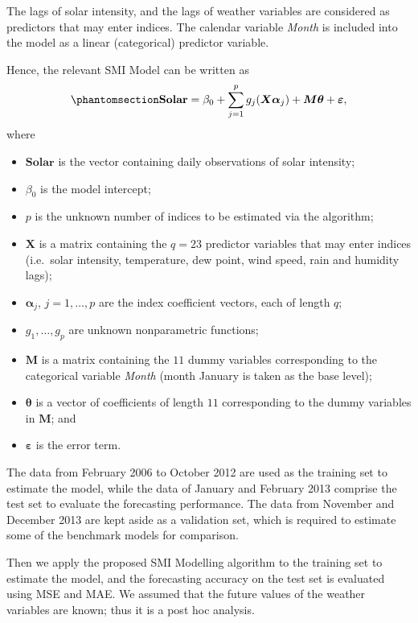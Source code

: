 \documentclass[
  11pt,
  a4paper,
]{article}
\providecommand{\tightlist}{%
  \setlength{\itemsep}{0pt}\setlength{\parskip}{0pt}}\usepackage{longtable,booktabs,array}
\begin{document}
The lags of solar intensity, and the lags of weather variables are
considered as predictors that may enter indices. The calendar variable
\emph{Month} is included into the model as a linear (categorical)
predictor variable.

Hence, the relevant SMI Model can be written as
\begin{equation}\phantomsection\label{eq-solar}{
  \textbf{Solar} = \beta_{0} + \sum_{j = 1}^{p}{g_{j}(\bm{X}\bm{\alpha}_{j})} + \bm{M}\bm{\theta} + \bm{\varepsilon},
}\end{equation} where

\begin{itemize}
\tightlist
\item
  \(\textbf{Solar}\) is the vector containing daily observations of
  solar intensity;
\item
  \(\beta_{0}\) is the model intercept;
\item
  \(p\) is the unknown number of indices to be estimated via the
  algorithm;
\item
  \(\bm{X}\) is a matrix containing the \(q=23\) predictor variables
  that may enter indices (i.e.~solar intensity, temperature, dew point,
  wind speed, rain and humidity lags);
\item
  \(\bm{\alpha}_{j}\), \(j = 1, \dots, p\) are the index coefficient
  vectors, each of length \(q\);
\item
  \(g_{1}, \dots, g_{p}\) are unknown nonparametric functions;
\item
  \(\bm{M}\) is a matrix containing the \(11\) dummy variables
  corresponding to the categorical variable \emph{Month} (month January
  is taken as the base level);
\item
  \(\bm{\theta}\) is a vector of coefficients of length \(11\)
  corresponding to the dummy variables in \(\bm{M}\); and
\item
  \(\bm{\varepsilon}\) is the error term.
\end{itemize}

The data from February 2006 to October 2012 are used as the training set
to estimate the model, while the data of January and February 2013
comprise the test set to evaluate the forecasting performance. The data
from November and December 2013 are kept aside as a validation set,
which is required to estimate some of the benchmark models for
comparison.

Then we apply the proposed SMI Modelling algorithm to the training set
to estimate the model, and the forecasting accuracy on the test set is
evaluated using MSE and MAE. We assumed that the future values of the
weather variables are known; thus it is a post hoc analysis.
\end{document}
